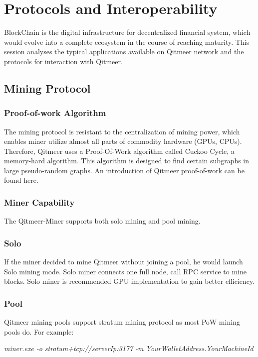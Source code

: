 \documentclass[a4paper,11pt]{article}
\begin{document}
\section{Protocols and Interoperability}
BlockChain is the digital infrastructure for decentralized financial system, which would evolve into a complete ecosystem in the course of reaching maturity. This session analyses the typical applications available on  Qitmeer network and the protocols for interaction with Qitmeer. 

\subsection{Mining Protocol}
\subsubsection{Proof-of-work Algorithm}

The mining protocol is resistant to the centralization of mining power, which enables miner utilize almost all parts of commodity hardware (GPUs, CPUs).
Therefore, Qitmeer uses a Proof-Of-Work algorithm called Cuckoo Cycle\cite{cuckoocycle},
a memory-hard algorithm. This algorithm is designed to find certain subgraphs in large pseudo-random graphs.
An introduction of Qitmeer proof-of-work can be found here.\cite{qitmeerpow}

\subsubsection{Miner Capability}

The Qitmeer-Miner supports both solo mining and pool mining.

\subsubsection*{Solo}
If the miner  decided to mine Qitmeer without joining a pool, he would launch Solo mining mode. Solo miner connects one full node, call RPC service to mine blocks. Solo miner is recommended GPU implementation to gain better efficiency.

\subsubsection*{Pool}
Qitmeer mining pools support stratum mining protocol as most PoW mining pools do.
For example:

\emph{miner.exe -o stratum+tcp://serverIp:3177 -m YourWalletAddress.YourMachineId}
\end{document}

